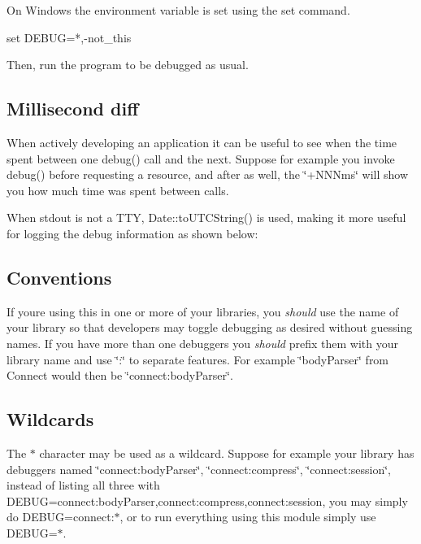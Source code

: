 On Windows the environment variable is set using the {\ttfamily set} command.


\begin{DoxyCode}
set DEBUG=*,-not\_this
\end{DoxyCode}


Then, run the program to be debugged as usual.

\subsection*{Millisecond diff}

When actively developing an application it can be useful to see when the time spent between one {\ttfamily debug()} call and the next. Suppose for example you invoke {\ttfamily debug()} before requesting a resource, and after as well, the \char`\"{}+\+N\+N\+Nms\char`\"{} will show you how much time was spent between calls.



When stdout is not a T\+TY, {\ttfamily Date\+::to\+U\+T\+C\+String()} is used, making it more useful for logging the debug information as shown below\+:



\subsection*{Conventions}

If you\textquotesingle{}re using this in one or more of your libraries, you {\itshape should} use the name of your library so that developers may toggle debugging as desired without guessing names. If you have more than one debuggers you {\itshape should} prefix them with your library name and use \char`\"{}\+:\char`\"{} to separate features. For example \char`\"{}body\+Parser\char`\"{} from Connect would then be \char`\"{}connect\+:body\+Parser\char`\"{}.

\subsection*{Wildcards}

The {\ttfamily $\ast$} character may be used as a wildcard. Suppose for example your library has debuggers named \char`\"{}connect\+:body\+Parser\char`\"{}, \char`\"{}connect\+:compress\char`\"{}, \char`\"{}connect\+:session\char`\"{}, instead of listing all three with {\ttfamily D\+E\+B\+UG=connect\+:body\+Parser,connect\+:compress,connect\+:session}, you may simply do {\ttfamily D\+E\+B\+UG=connect\+:$\ast$}, or to run everything using this module simply use {\ttfamily D\+E\+B\+UG=$\ast$}.

